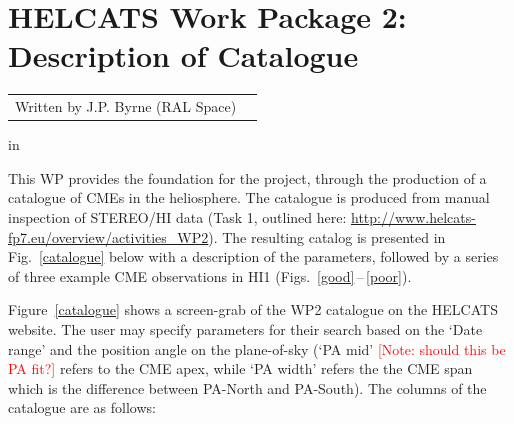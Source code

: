 \documentclass[10pt, a4paper, oneside]{article}
\begin{document}

\setcounter{page}{-1}






\section*{\sc \Large HELCATS Work Package 2: Description of Catalogue}

 
 \begin{center}
\begin{tabular}{ll}
\large Written by J.P. Byrne 	\hfill (RAL Space)
\end{tabular}
 \end{center}

 in



\setcounter{page}{1}



This WP provides the foundation for the project, through the production of a catalogue of CMEs in the heliosphere. The catalogue is produced from manual inspection of STEREO/HI data (Task 1, outlined here: \href{http://www.helcats-fp7.eu/overview/activities_WP2}{http://www.helcats-fp7.eu/overview/activities\_WP2}). The resulting catalog is presented in Fig.~\ref{catalogue} below with a description of the parameters, followed by a series of three example CME observations in HI1 (Figs.~\ref{good}\,--\,\ref{poor}). 

Figure~\ref{catalogue} shows a screen-grab of the WP2 catalogue on the HELCATS website. The user may specify parameters for their search based on the `Date range' and the position angle on the plane-of-sky (`PA mid' \textcolor{red}{[Note: should this be PA fit?]} refers to the CME apex, while `PA width' refers the the CME span which is the difference between PA-North and PA-South). The columns of the catalogue are as follows:
\end{document}
